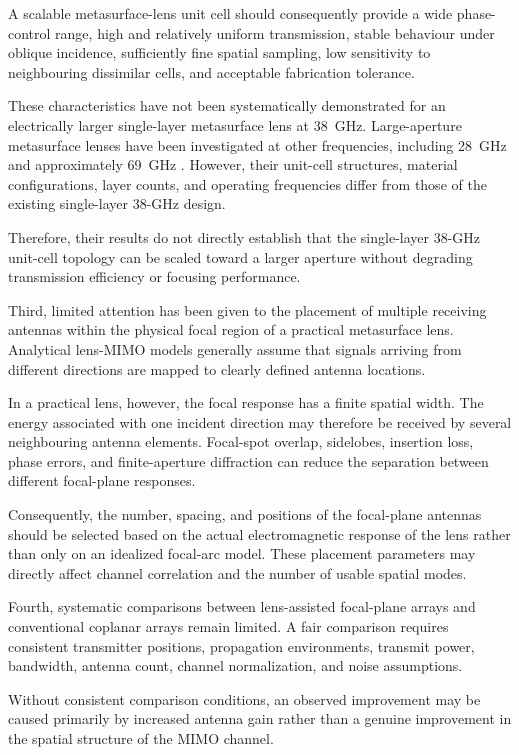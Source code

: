 A scalable metasurface-lens unit cell should consequently provide a
wide phase-control range, high and relatively uniform transmission,
stable behaviour under oblique incidence, sufficiently fine spatial
sampling, low sensitivity to neighbouring dissimilar cells, and
acceptable fabrication tolerance.

These characteristics have not been systematically demonstrated for
an electrically larger single-layer metasurface lens at 38~GHz.
Large-aperture metasurface lenses have been investigated at other
frequencies, including 28~GHz and approximately 69~GHz
\cite{Lee2022Large,Bagheri2023}. However, their
unit-cell structures, material configurations, layer counts, and
operating frequencies differ from those of the existing single-layer
38-GHz design.

Therefore, their results do not directly establish that the
single-layer 38-GHz unit-cell topology can be scaled toward a larger
aperture without degrading transmission efficiency or focusing
performance.

Third, limited attention has been given to the placement of multiple
receiving antennas within the physical focal region of a practical
metasurface lens. Analytical lens-MIMO models generally assume that
signals arriving from different directions are mapped to clearly
defined antenna locations.

In a practical lens, however, the focal response has a finite spatial
width. The energy associated with one incident direction may therefore
be received by several neighbouring antenna elements. Focal-spot
overlap, sidelobes, insertion loss, phase errors, and finite-aperture
diffraction can reduce the separation between different focal-plane
responses.

Consequently, the number, spacing, and positions of the focal-plane
antennas should be selected based on the actual electromagnetic
response of the lens rather than only on an idealized focal-arc
model. These placement parameters may directly affect channel
correlation and the number of usable spatial modes.

Fourth, systematic comparisons between lens-assisted focal-plane
arrays and conventional coplanar arrays remain limited. A fair
comparison requires consistent transmitter positions, propagation
environments, transmit power, bandwidth, antenna count, channel
normalization, and noise assumptions.

Without consistent comparison conditions, an observed improvement may
be caused primarily by increased antenna gain rather than a genuine
improvement in the spatial structure of the MIMO channel.

